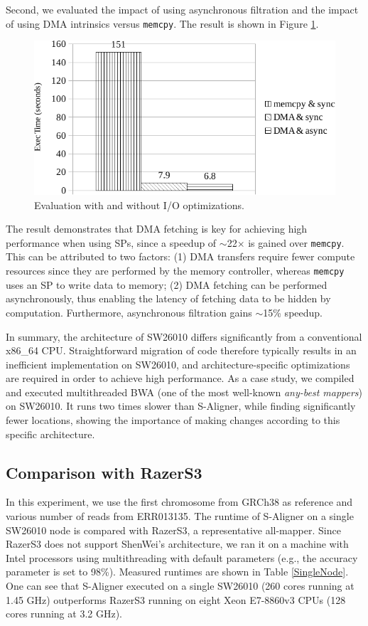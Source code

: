 \documentclass[conference]{IEEEtran}
\begin{document}
Second, we evaluated the impact of using asynchronous filtration and the impact of using DMA intrinsics versus \texttt{memcpy}. The result is shown in Figure \ref{VarOptCha}.

\begin{figure}[!htb]
	\begin{center}
		\includegraphics[width=1\linewidth]{VarOptCha}
		\caption{Evaluation with and without I/O optimizations.}
		\label{VarOptCha}
	\end{center}
\end{figure}

The result demonstrates that DMA fetching is key for achieving high performance when using SPs, since a speedup of $\sim$22$\times$ is gained over \texttt{memcpy}. This can be attributed to two factors: (1) DMA transfers require fewer compute resources since they are performed by the memory controller, whereas \texttt{memcpy} uses an SP to write data to memory; (2) DMA fetching can be performed asynchronously, thus enabling the latency of fetching data to be hidden by computation. Furthermore, asynchronous filtration gains $\sim$15\% speedup.

In summary, the architecture of SW26010 differs significantly from a conventional x86\_64 CPU. Straightforward migration of code therefore typically results in an inefficient implementation on SW26010, and architecture-specific optimizations are required in order to achieve high performance. As a case study, we compiled and executed multithreaded BWA \cite{bwa} (one of the most well-known {\em any-best mappers}) on SW26010. It runs two times slower than S-Aligner, while finding significantly fewer locations, showing the importance of making changes according to this specific architecture.

\subsection{Comparison with RazerS3}
In this experiment, we use the first chromosome from GRCh38 as reference and various number of reads from ERR013135. The runtime of S-Aligner on a single SW26010 node is compared with RazerS3, a representative all-mapper. Since RazerS3 does not support ShenWei's architecture, we ran it on a machine with Intel processors using multithreading with default parameters (e.g., the accuracy parameter is set to 98\%). Measured runtimes are shown in Table \ref{SingleNode}.  One can see that S-Aligner executed on a single SW26010 (260 cores running at 1.45 GHz) outperforms RazerS3 running on eight Xeon E7-8860v3 CPUs (128 cores running at 3.2 GHz).
\end{document}
